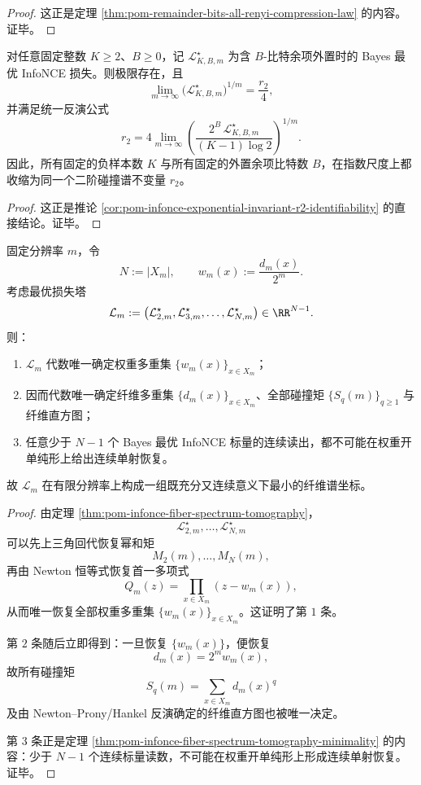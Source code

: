 \begin{proof}
这正是定理 \ref{thm:pom-remainder-bits-all-renyi-compression-law} 的内容。证毕。
\end{proof}

\begin{corollary}[任意固定对比协议的一致谱恢复]\label{cor:conclusion-fixed-infonce-protocol-uniform-r2-recovery}
对任意固定整数 \(K\ge 2\)、\(B\ge 0\)，记 \(\mathcal L_{K,B,m}^\star\) 为含
\(B\)-比特余项外置时的 Bayes 最优 InfoNCE 损失。则极限存在，且
\[
\lim_{m\to\infty}\bigl(\mathcal L_{K,B,m}^\star\bigr)^{1/m}=\frac{r_2}{4},
\]
并满足统一反演公式
\[
r_2
=
4\lim_{m\to\infty}
\left(
\frac{2^B\,\mathcal L_{K,B,m}^\star}{(K-1)\log 2}
\right)^{1/m}.
\]
因此，所有固定的负样本数 \(K\) 与所有固定的外置余项比特数 \(B\)，在指数尺度上都收缩为同一个二阶碰撞谱不变量 \(r_2\)。
\end{corollary}

\begin{proof}
这正是推论 \ref{cor:pom-infonce-exponential-invariant-r2-identifiability} 的直接结论。证毕。
\end{proof}

\begin{theorem}\label{thm:conclusion-infonce-tomography-dimension-exact}
固定分辨率 \(m\)，令
\[
N:=|X_m|,
\qquad
w_m(x):=\frac{d_m(x)}{2^m}.
\]
考虑最优损失塔
\[
\mathcal L_m:=
\bigl(
\mathcal L_{2,m}^\star,\mathcal L_{3,m}^\star,\dots,\mathcal L_{N,m}^\star
\bigr)\in\RR^{N-1}.
\]
则：
\begin{enumerate}
  \item \(\mathcal L_m\) 代数唯一确定权重多重集 \(\{w_m(x)\}_{x\in X_m}\)；
  \item 因而代数唯一确定纤维多重集 \(\{d_m(x)\}_{x\in X_m}\)、全部碰撞矩 \(\{S_q(m)\}_{q\ge 1}\) 与纤维直方图；
  \item 任意少于 \(N-1\) 个 Bayes 最优 InfoNCE 标量的连续读出，都不可能在权重开单纯形上给出连续单射恢复。
\end{enumerate}
故 \(\mathcal L_m\) 在有限分辨率上构成一组既充分又连续意义下最小的纤维谱坐标。
\end{theorem}

\begin{proof}
由定理 \ref{thm:pom-infonce-fiber-spectrum-tomography}，
\[
\mathcal L_{2,m}^\star,\dots,\mathcal L_{N,m}^\star
\]
可以先上三角回代恢复幂和矩
\[
M_2(m),\dots,M_N(m),
\]
再由 Newton 恒等式恢复首一多项式
\[
Q_m(z)=\prod_{x\in X_m}(z-w_m(x)),
\]
从而唯一恢复全部权重多重集 \(\{w_m(x)\}_{x\in X_m}\)。这证明了第 \(1\) 条。

第 \(2\) 条随后立即得到：一旦恢复 \(\{w_m(x)\}\)，便恢复
\[
d_m(x)=2^m w_m(x),
\]
故所有碰撞矩
\[
S_q(m)=\sum_{x\in X_m}d_m(x)^q
\]
及由 Newton--Prony/Hankel 反演确定的纤维直方图也被唯一决定。

第 \(3\) 条正是定理 \ref{thm:pom-infonce-fiber-spectrum-tomography-minimality} 的内容：少于 \(N-1\) 个连续标量读数，不可能在权重开单纯形上形成连续单射恢复。证毕。
\end{proof}
